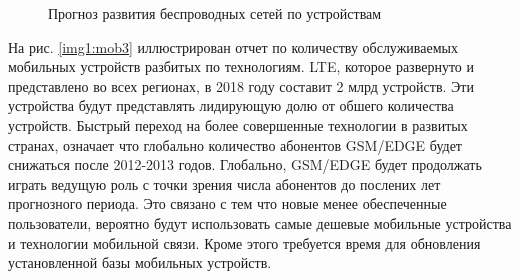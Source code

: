 \pgfplotsset{width=15cm, height=10cm, compat=1.3}
\begin{figure} [h]
  \center
{}
\caption{Прогноз развития беспроводных сетей по устройствам \cite{ericsson}}
  \label{img1:mob2}
\end{figure}


\clearpage


На рис. \ref{img1:mob3} иллюстрирован отчет по количеству обслуживаемых мобильных устройств разбитых по технологиям. LTE, которое развернуто и представлено во всех регионах, в 2018 году составит 2 млрд устройств. Эти устройства будут представлять лидирующую долю от обшего количества устройств. Быстрый переход на более совершенные технологии в развитых странах, означает что глобально количество абонентов GSM/EDGE будет снижаться после 2012-2013 годов. Глобально, GSM/EDGE будет продолжать играть ведущую роль с точки зрения числа абонентов до послених лет прогнозного периода. Это связано с тем что новые менее обеспеченные пользователи, вероятно будут использовать самые дешевые мобильные устройства и технологии мобильной связи. Кроме этого требуется время для обновления установленной базы мобильных устройств.


